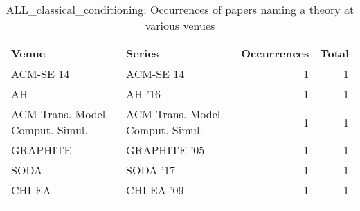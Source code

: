 \begin{table*}[t]
\begin{tabular}{llrr}
Venue & Series & Occurrences & Total\\\hline
\multirow{1}{*}{ACM-SE 14} & ACM-SE 14 & 1 & \multirow{1}{*}{1}\\
\multirow{1}{*}{AH } & AH '16 & 1 & \multirow{1}{*}{1}\\
\multirow{1}{*}{ACM Trans. Model. Comput. Simul.} & ACM Trans. Model. Comput. Simul. & 1 & \multirow{1}{*}{1}\\
\multirow{1}{*}{GRAPHITE } & GRAPHITE '05 & 1 & \multirow{1}{*}{1}\\
\multirow{1}{*}{SODA } & SODA '17 & 1 & \multirow{1}{*}{1}\\
\multirow{1}{*}{CHI EA } & CHI EA '09 & 1 & \multirow{1}{*}{1}\\
\caption{ALL_classical_conditioning: Occurrences of papers naming a theory at various venues}
\end{tabular}
\end{table*}